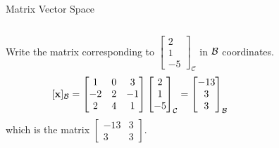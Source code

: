 \documentclass[xcolor=dvipsnames,aspectratio=169,t]{beamer}
\renewcommand{\C}{\mathcal{C}}
\begin{document}
\begin{frame}{Matrix Vector Space}
\begin{columns}[T]
\column{0.5\tw}

\pause
\bb
\addtocounter{enumi}{1}
\ii Write the matrix corresponding to $\begin{bmatrix} 2 \\ 1 \\ -5 \end{bmatrix}_{\C}$ in $\mathcal{B}$ coordinates.
\ee
\pause
\alert{\[ \lbrack \x \rbrack_{\B}  = \begin{bmatrix} 1 & 0 & 3 \\ -2 & 2 & -1 \\ 2 & 4 & 1 \end{bmatrix} \begin{bmatrix} 2 \\ 1 \\ -5 \end{bmatrix}_{\C} = \begin{bmatrix} -13 \\ 3  \\ 3 \end{bmatrix}_{\B} \]
which is the matrix $\begin{bmatrix} -13 & 3 \\ 3 & 3 \end{bmatrix}$.
}

\end{columns}
\end{frame}
\end{document}
